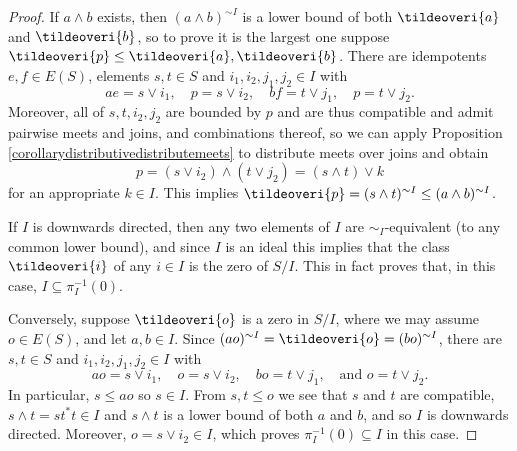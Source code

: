 \begin{proof}
If $a\land b$ exists, then $\left(a\land b\right)^{\sim I}$ is a lower bound of both $\tildeoveri{a}$ and $\tildeoveri{b}$, so to prove it is the largest one suppose $\tildeoveri{p}\leq \tildeoveri{a},\tildeoveri{b}$. There are idempotents $e,f\in E(S)$, elements $s,t\in S$ and $i_1,i_2,j_1,j_2\in I$ with
\[ae=s\lor i_1,\quad p=s\lor i_2,\quad bf=t\lor j_1,\quad p=t\lor j_2.\]
Moreover, all of $s,t,i_2,j_2$ are bounded by $p$ and are thus compatible and admit pairwise meets and joins, and combinations thereof, so we can apply Proposition \ref{corollarydistributivedistributemeets} to distribute meets over joins and obtain
\[p=(s\lor i_2)\land(t\lor j_2)=(s\land t)\lor k\]
for an appropriate $k\in I$. This implies $\tildeoveri{p}=(s\land t)^{\sim I}\leq(a\land b)^{\sim I}$.

If $I$ is downwards directed, then any two elements of $I$ are $\sim_I$-equivalent (to any common lower bound), and since $I$ is an ideal this implies that the class $\tildeoveri{i}$ of any $i\in I$ is the zero of $S/I$. This in fact proves that, in this case, $I\subseteq\pi_I^{-1}(0)$.

Conversely, suppose $\tildeoveri{o}$ is a zero in $S/I$, where we may assume $o\in E(S)$, and let $a,b\in I$. Since $(ao)^{\sim I}=\tildeoveri{o}=(bo)^{\sim I}$, there are $s,t\in S$ and $i_1,i_2,j_1,j_2\in I$ with
\[ao=s\lor i_1,\quad o=s\lor i_2,\quad bo=t\lor j_1,\quad\text{and } o=t\lor j_2.\]
In particular, $s\leq ao$ so $s\in I$. From $s,t\leq o$ we see that $s$ and $t$ are compatible, $s\land t=st^*t\in I$ and $s\land t$ is a lower bound of both $a$ and $b$, and so $I$ is downwards directed. Moreover, $o=s\lor i_2\in I$, which proves $\pi_I^{-1}(0)\subseteq I$ in this case.\qedhere
\end{proof}

